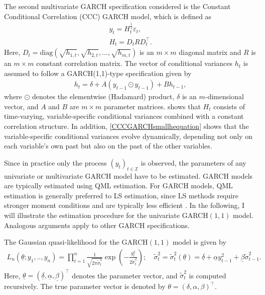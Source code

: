\documentclass[12pt,a4paper]{article}
\theoremstyle{definition}
\begin{document}
The second multivariate GARCH specification considered is the Constant Conditional Correlation (CCC) GARCH model, which is defined as
\begin{gather}
    y_t = H_t^{\frac{1}{2}}\varepsilon_t,\\
    \label{CCCGARCHHequation}
    H_t = D_t R D_t^{\top}.
\end{gather}
Here, $D_t=\text{diag}(\sqrt{h_{1,t}}, \sqrt{h_{2,t}}, \ldots, \sqrt{h_{m,t}})$ is an $m \times m$ diagonal matrix and $R$ is an $m \times m$ constant correlation matrix. The vector of conditional variances $h_t$ is assumed to follow a GARCH(1,1)-type specification given by
\begin{gather}
\label{CCCGARCHsmallhequation}
    h_t = \delta + A (y_{t-1} \odot y_{t-1}) + B h_{t-1},
\end{gather}
where $\odot$ denotes the elementwise (Hadamard) product, $\delta$ is an $m$-dimensional vector, and $A$ and $B$ are $m \times m$ parameter matrices.  shows that $H_t$ consists of time-varying, variable-specific conditional variances combined with a constant correlation structure. In addition, \cref{CCCGARCHsmallhequation} shows that the variable-specific conditional variances evolve dynamically, depending not only on each variable’s own past but also on the past of the other variables.

Since in practice only the process $(y_t)_{t\in\mathbb{Z}}$ is observed, the parameters of any univariate or multivariate GARCH model have to be estimated. GARCH models are typically estimated using QML estimation. For GARCH models, QML estimation is generally preferred to LS estimation, since LS methods require stronger moment conditions and are typically less efficient \citep{francq2019garch}. In the following, I will illustrate the estimation procedure for the univariate GARCH$(1,1)$ model. Analogous arguments apply to other GARCH specifications.

The Gaussian quasi-likelihood for the GARCH$(1,1)$ model is given by
\begin{gather}
    L_n(\underline{\theta};y_1,..,y_n)=\prod_{t=1}^n\frac{1}{\sqrt{2\pi \tilde{\sigma}_t^2}}\exp\left(-\frac{y_t^2}{2\tilde{\sigma}_t^2}\right); \quad \tilde{\sigma}_t^2=\tilde{\sigma}_t^2(\underline{\theta})=\underline{\delta}+\underline{\alpha} y_{t-1}^2+\underline{\beta}\tilde{\sigma}_{t-1}^2.
\end{gather}
Here, $\underline{\theta}=(\underline{\delta},\underline{\alpha},\underline{\beta})^\top$ denotes the parameter vector, and $\tilde{\sigma}_t^2$ is computed recursively. The true parameter vector is denoted by $\theta=(\delta,\alpha,\beta)^\top$.
\end{document}
